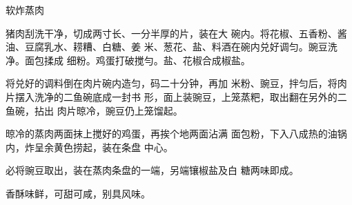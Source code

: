 \begin{recipe}{软炸蒸肉}

\ingredients






\cooking

\step 	猪肉刮洗干净，切成两寸长、一分半厚的片，装在大 碗内。将花椒、五香粉、酱油、豆腐乳水、耢糟、白糖、姜 米、葱花、盐、料酒在碗内兑好调匀。豌豆洗净。面包揉成 细粉。鸡蛋打破搅勻。盐、花椒合成椒盐。

\step 	将兑好的调料倒在肉片碗内造匀，码二十分钟，再加 米粉、豌豆，拌匀后，将肉片摆入洗净的二鱼碗底成一封书 形，面上装豌豆，上笼蒸粑，取出翻在另外的二鱼碗，拈出 肉片晾冷，豌豆仍上笼馏起。

\step 晾冷的蒸肉两面抹上搅好的鸡蛋，再挨个地两面沾满 面包粉，下入八成热的油锅内，炸呈余黄色捞起，装在条盘 中心。

必将豌豆取出，装在蒸肉条盘的一端，另端镶椒盐及白 糖两味即成。

\notes

香酥味鲜，可甜可咸，别具风味。

\end{recipe}

